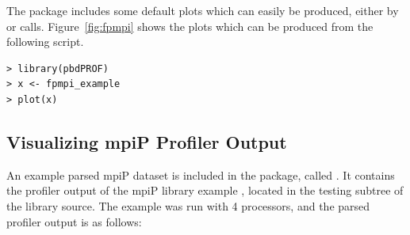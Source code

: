 The package includes some default plots which can easily be produced, either by  or  calls.  Figure~\ref{fig:fpmpi} shows the plots which can be produced from the following script.
\begin{lstlisting}[language=rr]
> library(pbdPROF)
> x <- fpmpi_example
> plot(x)
\end{lstlisting}


\subsection{Visualizing mpiP Profiler Output}

An example parsed mpiP dataset is included in the  package, called .  It contains the profiler output of the mpiP library example , located in the testing subtree of the library source.  The example was run with 4 processors, and the parsed profiler output is as follows:
